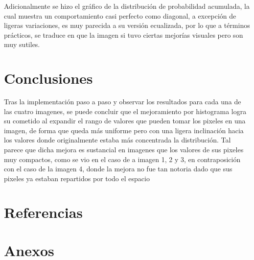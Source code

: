 \documentclass[11pt, letterpaper]{article}
\begin{document}
Adicionalmente se hizo el gráfico de la distribución de probabilidad acumulada, la cual muestra un comportamiento casi perfecto como diagonal, a excepción de ligeras variaciones, es muy parecida a su versión ecualizada, por lo que a términos prácticos, se traduce en que la imagen si tuvo ciertas mejorías visuales pero son muy sutiles.
	
	
\newpage

	
\section{Conclusiones}
	
Tras la implementación paso a paso y observar los resultados para cada una de las cuatro imagenes, se puede concluir que el mejoramiento por histograma logra su cometido al expandir el rango de valores que pueden tomar los pixeles en una imagen, de forma que queda más uniforme pero con una ligera inclinación hacia los valores donde originalmente estaba más concentrada la distribución. Tal parece que dicha mejora es sustancial en imagenes que los valores de sus pixeles muy compactos, como se vio en el caso de a imagen 1, 2 y 3, en contraposición con el caso de la imagen 4, donde la mejora no fue tan notoria dado que sus pixeles ya estaban repartidos por todo el espacio	


\newpage

	
\section{Referencias}  %

\newpage
	
\section{Anexos}	
\end{document}
